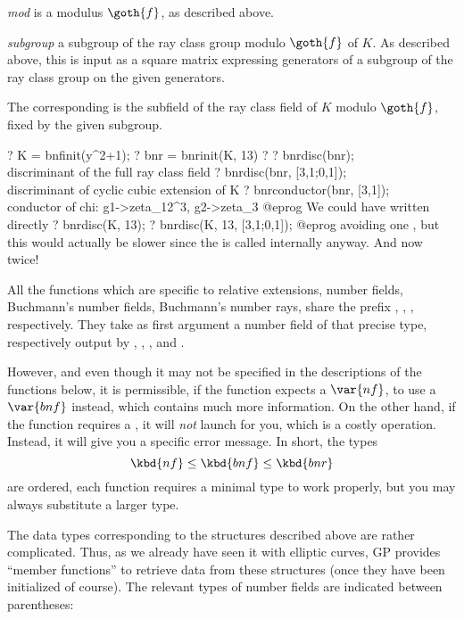 \item \emph{mod} is a modulus $\goth{f}$, as described above.

\item \emph{subgroup} a subgroup of the ray class group modulo $\goth{f}$ of
$K$. As described above, this is input as a square matrix expressing
generators of a subgroup of the ray class group  on the
given generators.

The corresponding  is the subfield of the ray class field of $K$
modulo $\goth{f}$, fixed by the given subgroup.

\bprog
  ? K = bnfinit(y^2+1);
  ? bnr = bnrinit(K, 13)
  ? %
  ? bnrdisc(bnr); \\ discriminant of the full ray class field
  ? bnrdisc(bnr, [3,1;0,1]); \\ discriminant of cyclic cubic extension of K
  ? bnrconductor(bnr, [3,1]); \\ conductor of chi: g1->zeta_12^3, g2->zeta_3
@eprog\noindent
We could have written directly
\bprog
  ? bnrdisc(K, 13);
  ? bnrdisc(K, 13, [3,1;0,1]);
@eprog\noindent
avoiding one , but this would actually be slower since the
 is called internally anyway. And now twice!


All the functions which are specific to relative extensions, number fields,
Buchmann's number fields, Buchmann's number rays, share the prefix ,
, ,  respectively. They take as first argument a
number field of that precise type, respectively output by ,
, , and .

However, and even though it may not be specified in the descriptions of the
functions below, it is permissible, if the function expects a $\var{nf}$, to
use a $\var{bnf}$ instead, which contains much more information. On the other
hand, if the function requires a , it will \emph{not} launch
 for you, which is a costly operation. Instead, it will give you
a specific error message. In short, the types
$$ \kbd{nf} \leq \kbd{bnf} \leq \kbd{bnr}$$
are ordered, each function requires a minimal type to work properly, but you
may always substitute a larger type.

The data types corresponding to the structures described above are rather
complicated. Thus, as we already have seen it with elliptic curves, GP
provides ``member functions'' to retrieve data from these structures (once
they have been initialized of course). The relevant types of number fields
are indicated between parentheses: \smallskip

